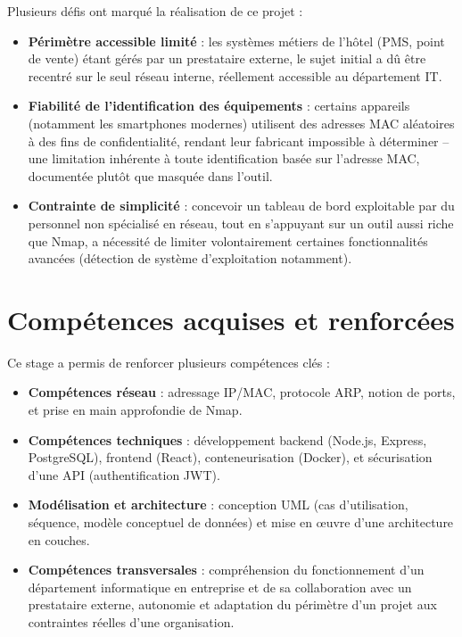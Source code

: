 Plusieurs défis ont marqué la réalisation de ce projet :
\begin{itemize}
    \item \textbf{Périmètre accessible limité} : les systèmes métiers de l'hôtel (PMS,
    point de vente) étant gérés par un prestataire externe, le sujet initial a dû être
    recentré sur le seul réseau interne, réellement accessible au département IT.
    \item \textbf{Fiabilité de l'identification des équipements} : certains appareils
    (notamment les smartphones modernes) utilisent des adresses MAC aléatoires à des
    fins de confidentialité, rendant leur fabricant impossible à déterminer -- une
    limitation inhérente à toute identification basée sur l'adresse MAC, documentée plutôt
    que masquée dans l'outil.
    \item \textbf{Contrainte de simplicité} : concevoir un tableau de bord exploitable
    par du personnel non spécialisé en réseau, tout en s'appuyant sur un outil aussi
    riche que Nmap, a nécessité de limiter volontairement certaines fonctionnalités
    avancées (détection de système d'exploitation notamment).
\end{itemize}

\section{Compétences acquises et renforcées}

Ce stage a permis de renforcer plusieurs compétences clés :
\begin{itemize}
    \item \textbf{Compétences réseau} : adressage IP/MAC, protocole ARP, notion de
    ports, et prise en main approfondie de Nmap.
    \item \textbf{Compétences techniques} : développement backend (Node.js, Express,
    PostgreSQL), frontend (React), conteneurisation (Docker), et sécurisation d'une API
    (authentification JWT).
    \item \textbf{Modélisation et architecture} : conception UML (cas d'utilisation,
    séquence, modèle conceptuel de données) et mise en \oe{}uvre d'une architecture en
    couches.
    \item \textbf{Compétences transversales} : compréhension du fonctionnement d'un
    département informatique en entreprise et de sa collaboration avec un prestataire
    externe, autonomie et adaptation du périmètre d'un projet aux contraintes réelles
    d'une organisation.
\end{itemize}

